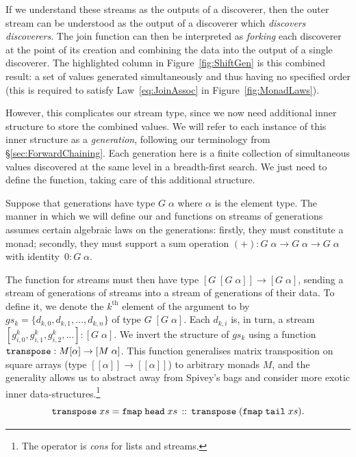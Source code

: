 If we understand these streams as the outputs of a discoverer, then the outer stream can be understood as the output of a discoverer which \emph{discovers discoverers}. The join function can then be interpreted as \emph{forking} each discoverer at the point of its creation and combining the data into the output of a single discoverer. The highlighted column in Figure~\ref{fig:ShiftGen} is this combined result: a set of values generated simultaneously and thus having no specified order (this is required to satisfy Law~\ref{eq:JoinAssoc} in Figure~\ref{fig:MonadLaws}).

However, this complicates our stream type, since we now need additional inner structure to store the combined values. We will refer to each instance of this inner structure as a \emph{generation}, following our terminology from \S\ref{sec:ForwardChaining}. Each generation here is a finite collection of simultaneous values discovered at the same level in a breadth-first search. We just need to define the  function, taking care of this additional structure.

Suppose that generations have type $G\;\alpha$ where $\alpha$ is the element type. The manner in which we will define our  and  functions on streams of generations assumes certain algebraic laws on the generations: firstly, they must constitute a monad; secondly, they must support a sum operation \mbox{$(+):G\;\alpha\rightarrow G\;\alpha\rightarrow G\;\alpha$} with identity~$0:G\;\alpha$. 

The  function for streams must then have type $[G\;[G\;\alpha]] \rightarrow [G\;\alpha]$, sending a stream of generations of streams into a stream of generations of their data. To define it, we denote the $k^{\text{th}}$ element of the argument to  by $gs_k = \{d_{k,0}, d_{k,1}, \ldots, d_{k,n}\}$ of type $G\;[G\;\alpha]$. Each $d_{k,i}$ is, in turn, a stream $[g^k_{i,0}, g^k_{i,1}, g^k_{i,2}, \ldots] : [G\;\alpha]$. We invert the structure of $gs_k$ using a function $\texttt{transpose}  : M[\alpha]\rightarrow [M\;\alpha]$. This function generalises matrix transposition on square arrays (type $[[\alpha]]\rightarrow[[\alpha]]$) to arbitrary monads $M$, and the generality allows us to abstract away from Spivey's bags and consider more exotic inner data-structures.\footnote{The operator \code{::} is \emph{cons} for lists and streams.}
\begin{displaymath}
\texttt{transpose}\;xs = \texttt{fmap}\;\texttt{head}\;xs\,::\,\texttt{transpose}\; (\texttt{fmap}\;\texttt{tail}\;xs).
\end{displaymath}

